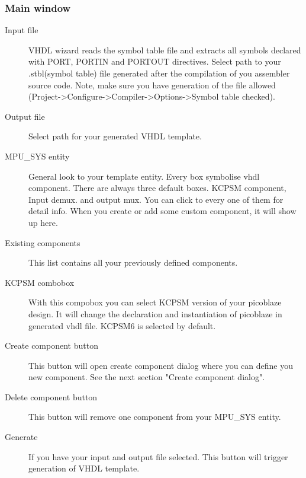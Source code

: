 \subsubsection{Main window}
    \begin{description}
        \item [Input file]
            VHDL wizard reads the symbol table file and extracts all symbols declared with PORT, PORTIN and PORTOUT directives. Select path to your .stbl(symbol table) file generated after the compilation of you assembler source code. Note, make sure you
            have generation of the file allowed (Project->Configure->Compiler->Options->Symbol table checked).
        \item [Output file]
            Select path for your generated VHDL template.
        \item [MPU\_SYS entity]
            General look to your template entity. Every box symbolise vhdl component. There are always three default boxes. KCPSM component, Input demux.
            and output mux. You can click to every one of them for detail info. When you create or add some custom component, it will show
            up here.
        \item [Existing components]
            This list contains all your previously defined components.
        \item [KCPSM combobox]
            With this compobox you can select KCPSM version of your picoblaze design. It will change the declaration and instantiation of picoblaze
            in generated vhdl file. KCPSM6 is selected by default.
        \item [Create component button]
            This button will open create component dialog where you can define you new component. See the next section "Create component dialog".
        \item [Delete component button]
            This button will remove one component from your MPU\_SYS entity.
        \item [Generate]
            If you have your input and output file selected. This button will trigger generation of VHDL template.
    \end{description}

